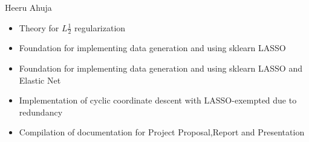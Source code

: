 \documentclass[11pt]{article}
\begin{document}
Heeru Ahuja
\begin{itemize}
	\item Theory for $L\frac{1}{2}$ regularization
	\item Foundation for implementing data generation and using sklearn LASSO
	\item Foundation for implementing data generation and using sklearn LASSO and Elastic Net
	\item Implementation of cyclic coordinate descent with LASSO-exempted due to redundancy
	\item Compilation of documentation for Project Proposal,Report and Presentation
\end{itemize}
\end{document}
